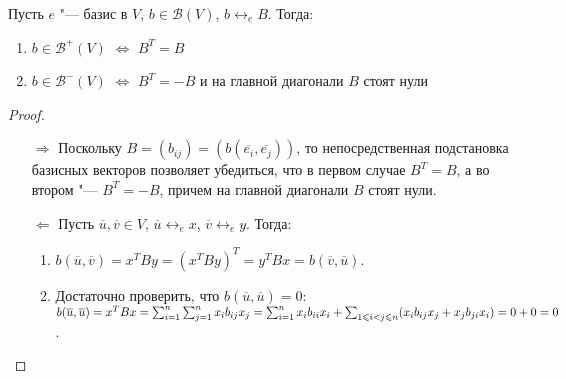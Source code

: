 \begin{proposition}
	Пусть $e$ "--- базис в $V$, $b \in \mathcal{B}(V)$, $b \leftrightarrow_e B$. Тогда:
	\begin{enumerate}
		\item $b \in \mathcal{B}^+(V)$ $\Leftrightarrow$ $B^T = B$
		\item $b \in \mathcal{B}^-(V)$ $\Leftrightarrow$ $B^T = -B$ и на главной диагонали $B$ стоят нули
	\end{enumerate}
\end{proposition}

\begin{proof}~
	\begin{itemize}
		\item[$\Rightarrow$] Поскольку $B = (b_{ij}) = (b(\overline{e_i}, \overline{e_j}))$, то непосредственная подстановка базисных векторов позволяет убедиться, что в первом случае $B^T = B$, а во втором "--- $B^T = -B$, причем на главной диагонали $B$ стоят нули.
		
		\item[$\Leftarrow$] Пусть $\overline{u}, \overline{v} \in V$, $\overline{u} \leftrightarrow_e x$, $\overline{v} \leftrightarrow_e y$. Тогда:
		\begin{enumerate}
			\item $b(\overline{u}, \overline{v}) = x^TBy = (x^TBy)^T = y^TBx = b(\overline{v}, \overline{u})$.
			\item Достаточно проверить, что $b(\overline{u}, \overline{u}) = 0$: $b(\overline{u}, \overline{u}) = x^TBx \hm{=} \sum_{i = 1}^n\sum_{j = 1}^nx_ib_{ij}x_j \hm= \sum_{i = 1}^nx_ib_{ii}x_i + \sum_{1 \le i < j \le n}(x_ib_{ij}x_j + x_jb_{ji}x_i) \hm{=} 0 + 0 = 0$.\qedhere
		\end{enumerate}
	\end{itemize}
\end{proof}